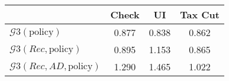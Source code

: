 \begin{tabular}{@{}lccc@{}} 
\toprule 
                          & Check      & UI    & Tax Cut    \\  \midrule 
$\mathcal{G}3(\text{policy})$ & 0.877  & 0.838  & 0.862     \\ 
$\mathcal{G}3(Rec,\text{policy})$ & 0.895  & 1.153  & 0.865     \\ 
$\mathcal{G}3(Rec, AD,\text{policy})$ & 1.290  & 1.465  & 1.022     \\ 
\end{tabular}  
